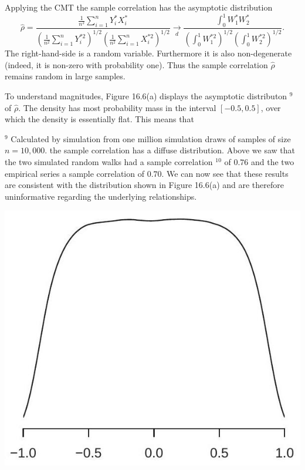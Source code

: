 \documentclass[10pt]{article}
\begin{document}
Applying the CMT the sample correlation has the asymptotic distribution
$$
\widehat{\rho}=\frac{\frac{1}{n^{2}} \sum_{i=1}^{n} Y_{i}^{*} X_{i}^{*}}{\left(\frac{1}{n^{2}} \sum_{i=1}^{n} Y_{i}^{* 2}\right)^{1 / 2}\left(\frac{1}{n^{2}} \sum_{i=1}^{n} X_{i}^{* 2}\right)^{1 / 2}} \underset{d}{\longrightarrow} \frac{\int_{0}^{1} W_{1}^{*} W_{2}^{*}}{\left(\int_{0}^{1} W_{1}^{* 2}\right)^{1 / 2}\left(\int_{0}^{1} W_{2}^{* 2}\right)^{1 / 2}} .
$$
The right-hand-side is a random variable. Furthermore it is also non-degenerate (indeed, it is non-zero with probability one). Thus the sample correlation $\widehat{\rho}$ remains random in large samples.

To understand magnitudes, Figure 16.6(a) displays the asymptotic distributon ${ }^{9}$ of $\widehat{\rho}$. The density has most probability mass in the interval $[-0.5,0.5]$, over which the density is essentially flat. This means that

${ }^{9}$ Calculated by simulation from one million simulation draws of samples of size $n=10,000$. the sample correlation has a diffuse distribution. Above we saw that the two simulated random walks had a sample correlation ${ }^{10}$ of $0.76$ and the two empirical series a sample correlation of $0.70$. We can now see that these results are consistent with the distribution shown in Figure 16.6(a) and are therefore uninformative regarding the underlying relationships.

\includegraphics[max width=\textwidth]{2022_10_23_e99fc7c58db661c6f219g-27}
\end{document}
